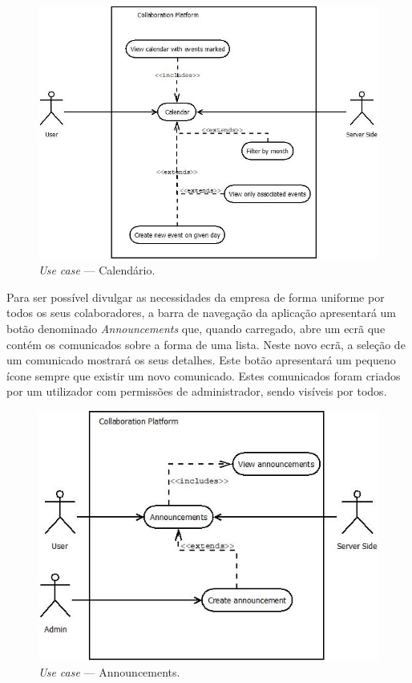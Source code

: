 \begin{figure}[H]
    \centering
    \includegraphics[scale=0.6]{figures/Calendar use case.jpeg}
    \caption{\textit{Use case} --- Calendário.}\label{fig:uc:calendar}
\end{figure}

Para ser possível divulgar as necessidades da empresa de forma uniforme por todos os seus colaboradores, a barra de navegação da aplicação apresentará 
um botão denominado \textit{Announcements} que, quando carregado, abre um ecrã que contém os comunicados sobre a forma de uma lista. 
Neste novo ecrã, a seleção de um comunicado mostrará os seus detalhes. 
Este botão apresentará um pequeno ícone sempre que existir um novo comunicado. 
Estes comunicados foram criados por um utilizador com permissões de administrador, sendo visíveis por todos.

\begin{figure}[H]
    \centering
    \includegraphics[scale=0.6]{figures/Announcements use case.jpeg}
    \caption{\textit{Use case} --- Announcements.}\label{fig:uc:announcements}
\end{figure}

